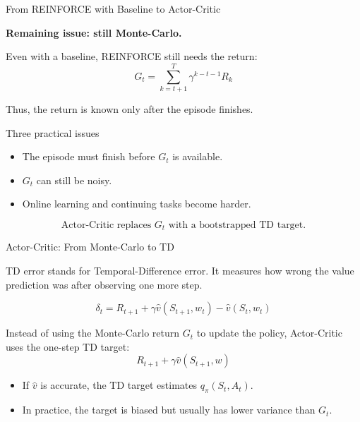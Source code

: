 \documentclass{beamer}
\begin{document}
\begin{frame}{From REINFORCE with Baseline to Actor-Critic}

\small

\textbf{Remaining issue: still Monte-Carlo.}

\vspace{0.1cm}

Even with a baseline, REINFORCE still needs the return:
\[
G_t
=
\sum_{k=t+1}^{T}
\gamma^{k-t-1}R_k
\]

\vspace{0.1cm}

Thus, the return is known only after the episode finishes.

\vspace{0.15cm}

\begin{block}{Three practical issues}
\begin{itemize}
    \item The episode must finish before \(G_t\) is available.
    \item \(G_t\) can still be noisy.
    \item Online learning and continuing tasks become harder.
\end{itemize}
\end{block}

\vspace{0.1cm}

\[
\text{Actor-Critic replaces } G_t
\text{ with a bootstrapped TD target.}
\]

\end{frame}

\begin{frame}{Actor-Critic: From Monte-Carlo to TD}

\small

TD error stands for Temporal-Difference error.
It measures how wrong the value prediction was after observing one more step.

\[
\delta_t
=
R_{t+1}
+
\gamma \hat{v}(S_{t+1},w_t)
-
\hat{v}(S_t,w_t)
\]

\vspace{0.1cm}

Instead of using the Monte-Carlo return \(G_t\) to update the policy,
Actor-Critic uses the one-step TD target:
\[
R_{t+1}
+
\gamma \hat{v}(S_{t+1},w)
\]

\vspace{0.1cm}

\begin{itemize}
    \item If \(\hat{v}\) is accurate, the TD target estimates \(q_\pi(S_t,A_t)\).
    \item In practice, the target is biased but usually has lower variance than \(G_t\).
\end{itemize}

\end{frame}
\end{document}
